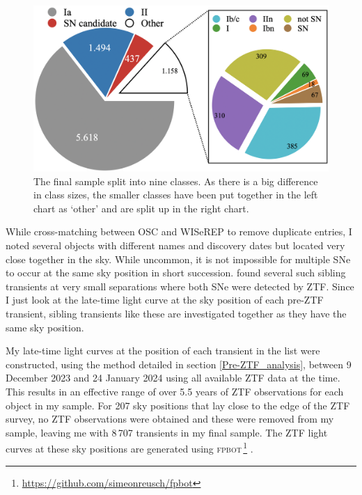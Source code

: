 \documentclass[a4paper,oneside,12pt, class=Latex/Classes/PhDthesisPSnPDF, crop=false]{standalone}
\begin{document}
\begin{figure}
    \centering
    \includegraphics[width=\textwidth]{../Images/chapter_4/sample_pie.png}
    \caption{The final sample split into nine classes. As there is a big difference in class sizes, the smaller classes have been put together in the left chart as `other' and are split up in the right chart.}
    \label{class_breakdown}
\end{figure}

While cross-matching between OSC and WISeREP to remove duplicate entries, I noted several objects with different names and discovery dates but located very close together in the sky. While uncommon, it is not impossible for multiple SNe to occur at the same sky position in short succession. \citet{Terwel_2024_paper1} found several such sibling transients at very small separations where both SNe were detected by ZTF. Since I just look at the late-time light curve at the sky position of each pre-ZTF transient, sibling transients like these are investigated together as they have the same sky position.

My late-time light curves at the position of each transient in the list were constructed, using the method detailed in section \ref{Pre-ZTF_analysis}, between 9 December 2023 and 24 January 2024 using all available ZTF data at the time. This results in an effective range of over 5.5 years of ZTF observations for each object in my sample. For 207 sky positions that lay close to the edge of the ZTF survey, no ZTF observations were obtained and these were removed from my sample, leaving me with 8\,707 transients in my final sample. The ZTF light curves at these sky positions are generated using \textsc{fpbot}\,\footnote{\url{https://github.com/simeonreusch/fpbot}} \citep{fpbot}.
\end{document}
